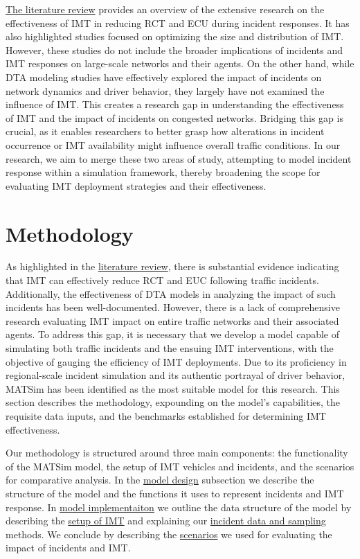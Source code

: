 \documentclass[fancy, oneside, mastersfancy, ms]{byuthesis}
\begin{document}
\protect\hyperlink{sec-literature}{The literature review} provides an
overview of the extensive research on the effectiveness of IMT in
reducing RCT and ECU during incident responses. It has also highlighted
studies focused on optimizing the size and distribution of IMT. However,
these studies do not include the broader implications of incidents and
IMT responses on large-scale networks and their agents. On the other
hand, while DTA modeling studies have effectively explored the impact of
incidents on network dynamics and driver behavior, they largely have not
examined the influence of IMT. This creates a research gap in
understanding the effectiveness of IMT and the impact of incidents on
congested networks. Bridging this gap is crucial, as it enables
researchers to better grasp how alterations in incident occurrence or
IMT availability might influence overall traffic conditions. In our
research, we aim to merge these two areas of study, attempting to model
incident response within a simulation framework, thereby broadening the
scope for evaluating IMT deployment strategies and their effectiveness.


\hypertarget{sec-methods}{%
\chapter{Methodology}\label{sec-methods}}

As highlighted in the \protect\hyperlink{sec-literature}{literature
review}, there is substantial evidence indicating that IMT can
effectively reduce RCT and EUC following traffic incidents.
Additionally, the effectiveness of DTA models in analyzing the impact of
such incidents has been well-documented. However, there is a lack of
comprehensive research evaluating IMT impact on entire traffic networks
and their associated agents. To address this gap, it is necessary that
we develop a model capable of simulating both traffic incidents and the
ensuing IMT interventions, with the objective of gauging the efficiency
of IMT deployments. Due to its proficiency in regional-scale incident
simulation and its authentic portrayal of driver behavior, MATSim has
been identified as the most suitable model for this research. This
section describes the methodology, expounding on the model's
capabilities, the requisite data inputs, and the benchmarks established
for determining IMT effectiveness.

Our methodology is structured around three main components: the
functionality of the MATSim model, the setup of IMT vehicles and
incidents, and the scenarios for comparative analysis. In the
\protect\hyperlink{sec-MATSim_mod}{model design} subsection we describe
the structure of the model and the functions it uses to represent
incidents and IMT response. In \protect\hyperlink{sec-model_imp}{model
implementaiton} we outline the data structure of the model by describing
the \protect\hyperlink{sec-IMT_setup}{setup of IMT} and explaining our
\protect\hyperlink{sec-inc_data}{incident data and sampling} methods. We
conclude by describing the \protect\hyperlink{sec-scenarios}{scenarios}
we used for evaluating the impact of incidents and IMT.
\end{document}
